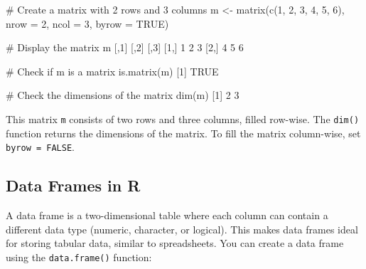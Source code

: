\documentclass[
  11pt,
]{book}
\makeatletter
\newenvironment{Shaded}{}{}
\newcommand{\AttributeTok}[1]{#1}
\newcommand{\CommentTok}[1]{\textcolor[rgb]{0.36,0.36,0.36}{#1}}
\newcommand{\ConstantTok}[1]{#1}
\newcommand{\DecValTok}[1]{#1}
\newcommand{\FunctionTok}[1]{#1}
\newcommand{\NormalTok}[1]{#1}
\newcommand{\OtherTok}[1]{\textcolor[rgb]{0.39,0.39,0.39}{#1}}
\newenvironment{kframe}{%
\medskip{}
\setlength{\fboxsep}{.8em}
 \def\at@end@of@kframe{}%
 \ifinner\ifhmode%
  \def\at@end@of@kframe{\end{minipage}}%
  \begin{minipage}{\columnwidth}%
 \fi\fi%
 \def\FrameCommand##1{\hskip\@totalleftmargin \hskip-\fboxsep
 \colorbox{shadecolor}{##1}\hskip-\fboxsep
     \hskip-\linewidth \hskip-\@totalleftmargin \hskip\columnwidth}%
 \MakeFramed {\advance\hsize-\width
   \@totalleftmargin\z@ \linewidth\hsize
   \@setminipage}}%
 {\par\unskip\endMakeFramed%
 \at@end@of@kframe}
\renewenvironment{Shaded}{\begin{kframe}}{\end{kframe}}
\theoremstyle{definition}
\theoremstyle{definition}
\theoremstyle{definition}
\theoremstyle{definition}
\theoremstyle{remark}
\makeatother
\begin{document}
\begin{Shaded}
\begin{Highlighting}[]
\CommentTok{\# Create a matrix with 2 rows and 3 columns}
\NormalTok{m }\OtherTok{\textless{}{-}} \FunctionTok{matrix}\NormalTok{(}\FunctionTok{c}\NormalTok{(}\DecValTok{1}\NormalTok{, }\DecValTok{2}\NormalTok{, }\DecValTok{3}\NormalTok{, }\DecValTok{4}\NormalTok{, }\DecValTok{5}\NormalTok{, }\DecValTok{6}\NormalTok{), }\AttributeTok{nrow =} \DecValTok{2}\NormalTok{, }\AttributeTok{ncol =} \DecValTok{3}\NormalTok{, }\AttributeTok{byrow =} \ConstantTok{TRUE}\NormalTok{)}

\CommentTok{\# Display the matrix}
\NormalTok{m}
\NormalTok{        [,}\DecValTok{1}\NormalTok{] [,}\DecValTok{2}\NormalTok{] [,}\DecValTok{3}\NormalTok{]}
\NormalTok{   [}\DecValTok{1}\NormalTok{,]    }\DecValTok{1}    \DecValTok{2}    \DecValTok{3}
\NormalTok{   [}\DecValTok{2}\NormalTok{,]    }\DecValTok{4}    \DecValTok{5}    \DecValTok{6}

\CommentTok{\# Check if m is a matrix}
\FunctionTok{is.matrix}\NormalTok{(m)}
\NormalTok{   [}\DecValTok{1}\NormalTok{] }\ConstantTok{TRUE}

\CommentTok{\# Check the dimensions of the matrix}
\FunctionTok{dim}\NormalTok{(m)}
\NormalTok{   [}\DecValTok{1}\NormalTok{] }\DecValTok{2} \DecValTok{3}
\end{Highlighting}
\end{Shaded}

This matrix \texttt{m} consists of two rows and three columns, filled row-wise. The \texttt{dim()} function returns the dimensions of the matrix. To fill the matrix column-wise, set \texttt{byrow\ =\ FALSE}.

\subsection*{Data Frames in R}\label{data-frames-in-r}


A data frame is a two-dimensional table where each column can contain a different data type (numeric, character, or logical). This makes data frames ideal for storing tabular data, similar to spreadsheets. You can create a data frame using the \texttt{data.frame()} function:
\end{document}
